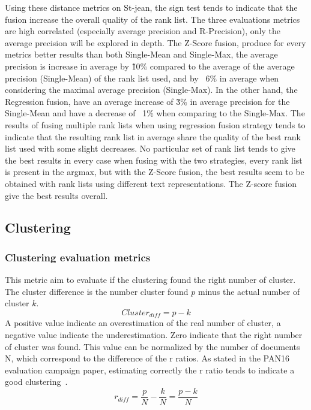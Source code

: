 Using these distance metrics on St-jean, the sign test tends to indicate that the fusion increase the overall quality of the rank list.
The three evaluations metrics are high correlated (especially average precision and R-Precision), only the average precision will be explored in depth.
The Z-Score fusion, produce for every metrics better results than both Single-Mean and Single-Max, the average precision is increase in average by \~10\% compared to the average of the average precision (Single-Mean) of the rank list used, and by ~6\% in average when considering the maximal average precision (Single-Max).
In the other hand, the Regression fusion, have an average increase of \~3\% in average precision for the Single-Mean and have a decrease of ~1\% when comparing to the Single-Max.
The results of fusing multiple rank lists when using regression fusion strategy tends to indicate that the resulting rank list in average share the quality of the best rank list used with some slight decreases.
No particular set of rank list tends to give the best results in every case when fusing with the two strategies, every rank list is present in the argmax, but with the Z-Score fusion, the best results seem to be obtained with rank lists using different text representations.
The Z-score fusion give the best results overall.


\newpage
\subsection{Clustering}

\subsubsection{Clustering evaluation metrics}

\begin{definition}
  This metric aim to evaluate if the clustering found the right number of cluster.
  The cluster difference is the number cluster found $p$ minus the actual number of cluster $k$.
  \begin{equation}
    Cluster_{diff} = p - k
  \end{equation}
  A positive value indicate an overestimation of the real number of cluster, a negative value indicate the underestimation.
  Zero indicate that the right number of cluster was found.
  This value can be normalized by the number of documents N, which correspond to the difference of the r ratios.
  As stated in the PAN16 evaluation campaign paper, estimating correctly the r ratio tends to indicate a good clustering~\cite{pan16}.
  \begin{equation}
    r_{diff} = \frac{p}{N} - \frac{k}{N} = \frac{p - k}{N}
  \end{equation}
\end{definition}

